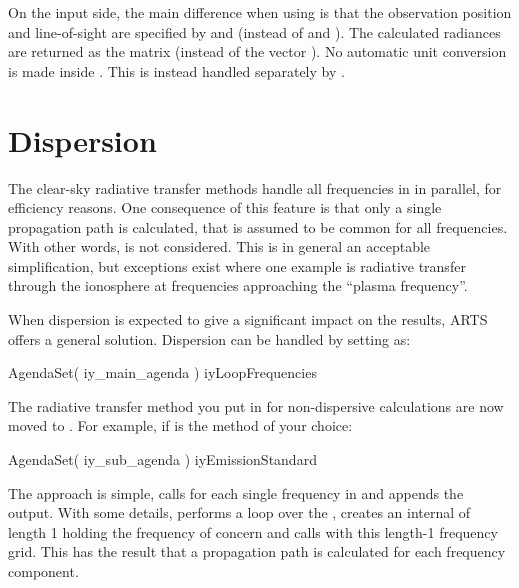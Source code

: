 On the input side, the main difference when using  is that
the observation position and line-of-sight are specified by 
and  (instead of  and
). The calculated radiances are returned as the matrix
 (instead of the vector ). 
No automatic unit conversion is made inside . This is
instead handled separately by .




\section{Dispersion}
\label{sec:fm_defs:dispersion}

The clear-sky radiative transfer methods handle all frequencies in
 in parallel, for efficiency reasons. One consequence of
this feature is that only a single propagation path is calculated, that is
assumed to be common for all frequencies. With other words,
 is not considered. This is in general an acceptable
simplification, but exceptions exist where one example is radiative
transfer through the ionosphere at frequencies approaching the ``plasma
frequency''.

When dispersion is expected to give a significant impact on the results, ARTS
offers a general solution. Dispersion can be handled by setting
 as:
\begin{code}
AgendaSet( iy_main_agenda ){
  iyLoopFrequencies
}
\end{code}
The radiative transfer method you put in  for
non-dispersive calculations are now moved to . For
example, if  is the method of your choice:
\begin{code}
AgendaSet( iy_sub_agenda ){
  iyEmissionStandard
}
\end{code}
The approach is simple,  calls
 for each single frequency in 
and appends the output. With some details, 
performs a loop over the , creates an internal
 of length 1 holding the frequency of concern and calls
 with this length-1 frequency grid. This has the
result that a propagation path is calculated for each frequency component.

